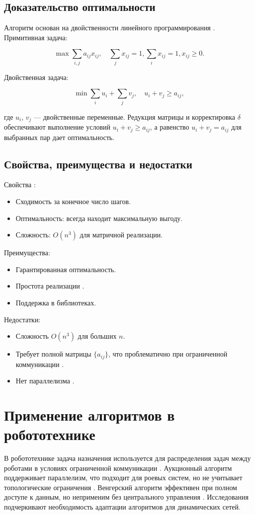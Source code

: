\subsection{Доказательство оптимальности}
Алгоритм основан на двойственности линейного программирования \cite{kuhn1955}. Примитивная задача:

\[
\max \sum_{i,j} a_{ij} x_{ij}, \quad \sum_{j} x_{ij} = 1, \sum_{i} x_{ij} = 1, x_{ij} \geq 0.
\]

Двойственная задача:

\[
\min \sum_{i} u_i + \sum_{j} v_j, \quad u_i + v_j \geq a_{ij},
\]

где $u_i$, $v_j$ --- двойственные переменные. Редукция матрицы и корректировка $\delta$ обеспечивают выполнение условий $u_i + v_j \geq a_{ij}$, а равенство $u_i + v_j = a_{ij}$ для выбранных пар дает оптимальность.

\subsection{Свойства, преимущества и недостатки}
Свойства \cite{kuhn1955, emaxx2025}:
\begin{itemize}
    \item Сходимость за конечное число шагов.
    \item Оптимальность: всегда находит максимальную выгоду.
    \item Сложность: $O(n^3)$ для матричной реализации.
\end{itemize}

Преимущества:
\begin{itemize}
    \item Гарантированная оптимальность.
    \item Простота реализации \cite{emaxx2025}.
    \item Поддержка в библиотеках.
\end{itemize}

Недостатки:
\begin{itemize}
    \item Сложность $O(n^3)$ для больших $n$.
    \item Требует полной матрицы $\{a_{ij}\}$, что проблематично при ограниченной коммуникации \cite{gerkey2003}.
    \item Нет параллелизма \cite{bertsekas1989}.
\end{itemize}

\section{Применение алгоритмов в робототехнике}
В робототехнике задача назначения используется для распределения задач между роботами в условиях ограниченной коммуникации \cite{kalyaev2009, pshikhopov2015}. Аукционный алгоритм \cite{bertsekas1990} поддерживает параллелизм, что подходит для роевых систем, но не учитывает топологические ограничения \cite{gerkey2003}. Венгерский алгоритм \cite{kuhn1955, emaxx2025} эффективен при полном доступе к данным, но неприменим без центрального управления \cite{kalyaev2009}. Исследования \cite{pshikhopov2015, gerkey2003} подчеркивают необходимость адаптации алгоритмов для динамических сетей.

